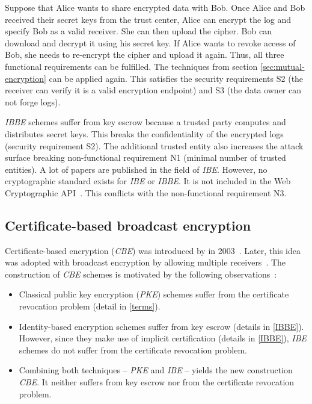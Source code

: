 \documentclass[../main.tex]{subfiles}
\begin{document}
Suppose that Alice wants to share encrypted data with Bob.
Once Alice and Bob received their secret keys from the trust center, Alice can encrypt the log and specify Bob as a valid receiver.
She can then upload the cipher.
Bob can download and decrypt it using his secret key.
If Alice wants to revoke access of Bob, she needs to re-encrypt the cipher and upload it again.
Thus, all three functional requirements can be fulfilled.
The techniques from section \ref{sec:mutual-encryption} can be applied again.
This satisfies the security requirements S2 (the receiver can verify it is a valid encryption endpoint) and S3 (the data owner can not forge logs).

\textit{IBBE} schemes suffer from key escrow because a trusted party computes and distributes secret keys.
This breaks the confidentiality of the encrypted logs (security requirement S2).
The additional trusted entity also increases the attack surface breaking non-functional requirement N1 (minimal number of trusted entities).
A lot of papers are published in the field of \textit{IBE}.
However, no cryptographic standard exists for \textit{IBE} or \textit{IBBE}.
It is not included in the Web Cryptographic API~\cite{WebCryptoApi2017}.
This conflicts with the non-functional requirement N3.

\subsection{Certificate-based broadcast encryption}
\label{sec:broadcast-certificate}

Certificate-based encryption (\textit{CBE}) was introduced by \citeauthor{Gentry2003} in 2003~\cite{Gentry2003}. 
Later, this idea was adopted with broadcast encryption by allowing multiple receivers~\cite{Li2018, Fan2013}.
The construction of \textit{CBE} schemes is motivated by the following observations~\cite{Gentry2003}:

\begin{itemize}
    \item Classical public key encryption (\textit{PKE}) schemes suffer from the certificate revocation problem (detail in \cref{terms}).
    \item Identity-based encryption schemes suffer from key escrow (details in \cref{IBBE}).
    However, since they make use of implicit certification (details in \cref{IBBE}), \textit{IBE} schemes do not suffer from the certificate revocation problem.
    \item Combining both techniques -- \textit{PKE} and \textit{IBE} -- yields the new construction \textit{CBE}. 
    It neither suffers from key escrow nor from the certificate revocation problem.
\end{itemize}
\end{document}
